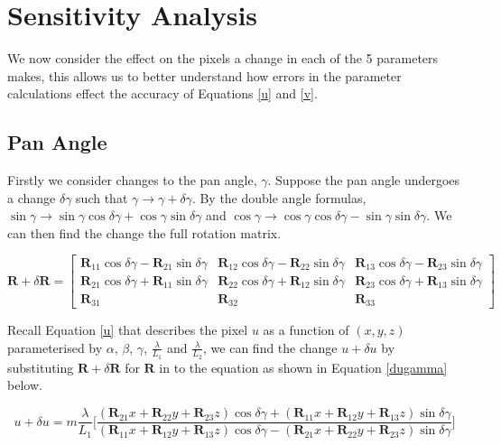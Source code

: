 \documentclass[12pt]{article}
\newcommand{\mtx}[1]{\ensuremath{\mathbf{#1}}}
\begin{document}
\section{Sensitivity Analysis}

We now consider the effect on the pixels a change in each of the 5 parameters makes, this allows us to better understand how errors in the parameter calculations effect the accuracy of Equations \ref{u} and \ref{v}.

\subsection{Pan Angle}
Firstly we consider changes to the pan angle, $\gamma$. Suppose the pan angle undergoes a change $\delta\gamma$ such that $\gamma \rightarrow \gamma + \delta\gamma$. By the double angle formulas, $\sin\gamma\rightarrow\sin\gamma\cos\delta\gamma + \cos\gamma\sin\delta\gamma$ and $\cos\gamma\rightarrow\cos\gamma\cos\delta\gamma - \sin\gamma\sin\delta\gamma$. We can then find the change the full rotation matrix.

\begin{equation}
 \mtx{R} + \delta\mtx{R} =
  \begin{bmatrix}
    \mtx{R}_{11}\cos\delta\gamma - \mtx{R}_{21}\sin\delta\gamma & \mtx{R}_{12}\cos\delta\gamma - \mtx{R}_{22}\sin\delta\gamma & \mtx{R}_{13}\cos\delta\gamma - \mtx{R}_{23}\sin\delta\gamma \\

    \mtx{R}_{21}\cos\delta\gamma + \mtx{R}_{11}\sin\delta\gamma & \mtx{R}_{22}\cos\delta\gamma + \mtx{R}_{12}\sin\delta\gamma & \mtx{R}_{23}\cos\delta\gamma + \mtx{R}_{13}\sin\delta\gamma \\

    \mtx{R}_{31} & \mtx{R}_{32} & \mtx{R}_{33}
 \end{bmatrix}
\end{equation}

Recall Equation \ref{u} that describes the pixel $u$ as a function of $(x,y,z)$ parameterised by $\alpha$, $\beta$, $\gamma$, $\frac{\lambda}{L_1}$ and $\frac{\lambda}{L_2}$, we can find the change $u + \delta u$ by substituting $\mtx{R} + \delta\mtx{R}$ for $\mtx{R}$ in to the equation as shown in Equation \ref{dugamma} below.

\begin{equation}\label{dugamma}
    u + \delta u = m\frac{\lambda}{L_1}
        \bigg[\frac{(\mtx{R}_{21}x + \mtx{R}_{22}y + \mtx{R}_{23}z)\cos\delta\gamma 
                  + (\mtx{R}_{11}x + \mtx{R}_{12}y + \mtx{R}_{13}z)\sin\delta\gamma}
                   {(\mtx{R}_{11}x + \mtx{R}_{12}y + \mtx{R}_{13}z)\cos\delta\gamma -(\mtx{R}_{21}x + \mtx{R}_{22}y + \mtx{R}_{23}z)\sin\delta\gamma}                  
        \bigg]
\end{equation}
\end{document}
